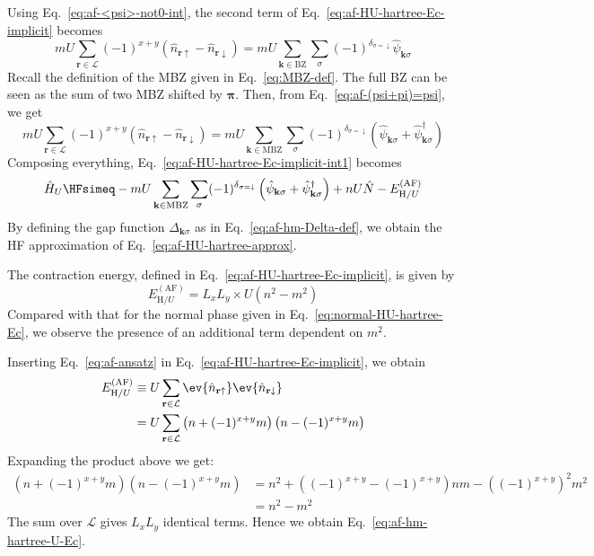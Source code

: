 \begin{tabproof}
	Using Eq.~\eqref{eq:af-<psi>-not0-int}, the second term of Eq.~\eqref{eq:af-HU-hartree-Ec-implicit} becomes
	\[
	mU \sum_{\mathbf{r}\in\mathcal{L}} (-1)^{x+y} \left(
	\hat n_{\mathbf{r}\uparrow} - \hat n_{\mathbf{r}\downarrow}
	\right) = mU \sum_{\mathbf{k} \in \mathrm{BZ}} \sum_\sigma (-1)^{\delta_{\sigma=\downarrow}} \hat \psi_{\mathbf{k}\sigma}
	\]
	Recall the definition of the MBZ given in Eq.~\eqref{eq:MBZ-def}. The full BZ can be seen as the sum of two MBZ shifted by $\bm{\pi}$. Then, from Eq.~\eqref{eq:af-(psi+pi)=psi}, we get
	\[
	mU \sum_{\mathbf{r}\in\mathcal{L}} (-1)^{x+y} \left(
	\hat n_{\mathbf{r}\uparrow} - \hat n_{\mathbf{r}\downarrow}
	\right) = mU \sum_{\mathbf{k} \in \mathrm{MBZ}} \sum_\sigma (-1)^{\delta_{\sigma=\downarrow}} \left(
	\hat \psi_{\mathbf{k}\sigma} + \hat \psi_{\mathbf{k}\sigma}^\dagger
	\right)
	\]
	Composing everything, Eq.~\eqref{eq:af-HU-hartree-Ec-implicit-int1} becomes
	\[
	\hat H_U \HFsimeq - mU \sum_{\mathbf{k}\in\mathrm{MBZ}} \sum_\sigma (-1)^{\delta_{\sigma=\downarrow}} \left(
	\hat \psi_{\mathbf{k}\sigma} + \hat \psi_{\mathbf{k}\sigma}^\dagger
	\right) + nU \hat N - E_{\mathrm{H}/U}^{(\mathrm{AF})}
	\]
	By defining the gap function $\Delta_{\mathbf{k}\sigma}$ as in Eq.~\eqref{eq:af-hm-Delta-def}, we obtain the HF approximation of Eq.~\eqref{eq:af-HU-hartree-approx}.
	
\end{tabproof}

The contraction energy, defined in Eq.~\eqref{eq:af-HU-hartree-Ec-implicit}, is given by
\begin{equation}\label{eq:af-hm-hartree-U-Ec}
	E_{\mathrm{H}/U}^{(\mathrm{AF})} = L_x L_y \times U \left(
	n^2 - m^2
	\right)
\end{equation}
Compared with that for the normal phase given in Eq.~\eqref{eq:normal-HU-hartree-Ec}, we observe the presence of an additional term dependent on $m^2$.

\begin{tabproof}
	
	Inserting Eq.~\eqref{eq:af-ansatz} in Eq.~\eqref{eq:af-HU-hartree-Ec-implicit}, we obtain
	\[
	\begin{aligned}
		E_{\mathrm{H}/U}^{(\mathrm{AF})} &\equiv U \sum_{\mathbf{r}\in\mathcal{L}} \ev{\hat n_{\mathbf{r}\uparrow}} \ev{\hat n_{\mathbf{r}\downarrow}} \\
		&= U \sum_{\mathbf{r}\in\mathcal{L}} \left(
		n + (-1)^{x+y} m
		\right) \left(
		n - (-1)^{x+y} m
		\right) \\
	\end{aligned}
	\]
	Expanding the product above we get:
	\[
	\begin{aligned}
		\left(
		n + (-1)^{x+y} m
		\right) \left(
		n - (-1)^{x+y} m
		\right) &= n^2 + \left(
		(-1)^{x+y} - (-1)^{x+y}
		\right)nm - \left((-1)^{x+y}\right)^2 m^2 \\
		&= n^2 - m^2
	\end{aligned}
	\]
	The sum over $\mathcal{L}$ gives $L_x L_y$ identical terms. Hence we obtain Eq.~\eqref{eq:af-hm-hartree-U-Ec}.
	
\end{tabproof}


